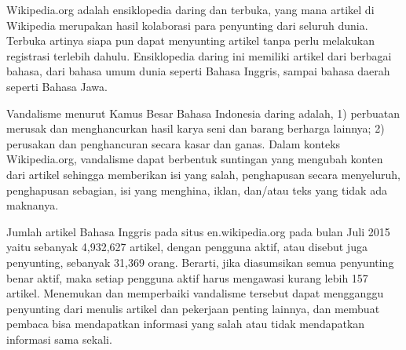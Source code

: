 Wikipedia.org adalah ensiklopedia daring dan terbuka, yang mana artikel di
Wikipedia merupakan hasil kolaborasi para penyunting dari seluruh dunia.
Terbuka artinya siapa pun dapat menyunting artikel tanpa perlu melakukan
registrasi terlebih dahulu.
Ensiklopedia daring ini memiliki artikel dari berbagai bahasa, dari bahasa umum
dunia seperti Bahasa Inggris, sampai bahasa daerah seperti Bahasa Jawa.

Vandalisme menurut Kamus Besar Bahasa Indonesia daring adalah,
1) perbuatan merusak dan menghancurkan hasil karya seni dan barang berharga
lainnya;
2) perusakan dan penghancuran secara kasar dan ganas.
Dalam konteks Wikipedia.org, vandalisme dapat berbentuk suntingan yang mengubah
konten dari artikel sehingga memberikan isi yang salah, penghapusan secara
menyeluruh, penghapusan sebagian, isi yang menghina, iklan, dan/atau teks yang
tidak ada maknanya.

Jumlah artikel Bahasa Inggris pada situs en.wikipedia.org pada bulan Juli 2015
yaitu sebanyak 4,932,627 artikel, dengan pengguna aktif, atau disebut juga
penyunting, sebanyak 31,369 orang.
Berarti, jika diasumsikan semua penyunting benar aktif, maka setiap pengguna
aktif harus mengawasi kurang lebih 157 artikel.
Menemukan dan memperbaiki vandalisme tersebut dapat mengganggu penyunting dari
menulis artikel dan pekerjaan penting lainnya, dan membuat pembaca bisa
mendapatkan informasi yang salah atau tidak mendapatkan informasi sama sekali.
